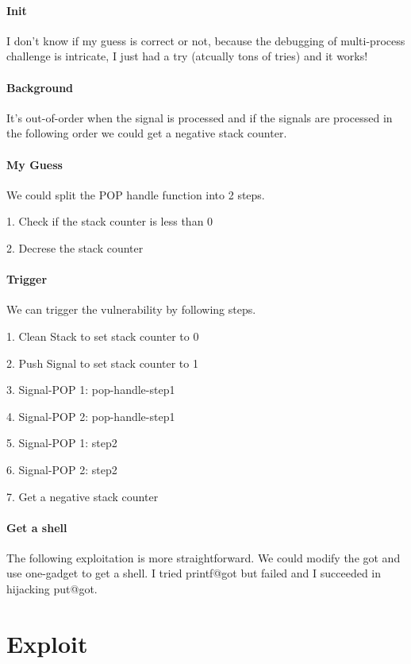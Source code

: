 \documentclass{article}
\begin{document}
\paragraph{Init}
I don't know if my guess is correct or not,
 because the debugging of multi-process challenge is
 intricate, I just had a try (atcually tons of tries) and it works!

\paragraph{Background}

It's out-of-order when the signal is 
processed and if the signals are processed in the
 following order we could get a negative stack counter.

\paragraph{My Guess}

We could split the POP handle function into 2 steps.

1. Check if the stack counter is less than 0

2. Decrese the stack counter

\paragraph{Trigger}
We can trigger the vulnerability by following steps.

1. Clean Stack to set stack counter to 0

2. Push Signal to set stack counter to 1

3. Signal-POP 1: pop-handle-step1

4. Signal-POP 2: pop-handle-step1

5. Signal-POP 1: step2

6. Signal-POP 2: step2

7. Get a negative stack counter

\paragraph{Get a shell}
The following exploitation is more straightforward.
 We could modify the got and use one-gadget to get
a shell. I tried printf@got but failed and 
I succeeded in hijacking put@got.

\section{Exploit}
\end{document}
